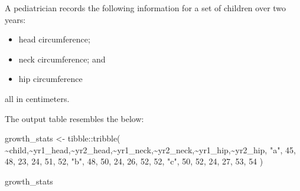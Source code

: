 \documentclass[
  letterpaper,
  DIV=11,
  numbers=noendperiod]{scrreprt}
\newenvironment{Shaded}{\begin{snugshade}}{\end{snugshade}}
\newcommand{\DecValTok}[1]{\textcolor[rgb]{0.68,0.00,0.00}{#1}}
\newcommand{\FunctionTok}[1]{\textcolor[rgb]{0.28,0.35,0.67}{#1}}
\newcommand{\NormalTok}[1]{\textcolor[rgb]{0.00,0.23,0.31}{#1}}
\newcommand{\OtherTok}[1]{\textcolor[rgb]{0.00,0.23,0.31}{#1}}
\newcommand{\SpecialCharTok}[1]{\textcolor[rgb]{0.37,0.37,0.37}{#1}}
\newcommand{\StringTok}[1]{\textcolor[rgb]{0.13,0.47,0.30}{#1}}
\providecommand{\tightlist}{%
  \setlength{\itemsep}{0pt}\setlength{\parskip}{0pt}}\usepackage{longtable,booktabs,array}
\begin{document}
\begin{tcolorbox}[enhanced jigsaw, title=\textcolor{quarto-callout-tip-color}{\faLightbulb}\hspace{0.5em}{Practice}, colbacktitle=quarto-callout-tip-color!10!white, leftrule=.75mm, arc=.35mm, opacityback=0, bottomrule=.15mm, rightrule=.15mm, toptitle=1mm, breakable, toprule=.15mm, colback=white, coltitle=black, colframe=quarto-callout-tip-color-frame, bottomtitle=1mm, titlerule=0mm, left=2mm, opacitybacktitle=0.6]

A pediatrician records the following information for a set of children
over two years:

\begin{itemize}
\tightlist
\item
  head circumference;
\item
  neck circumference; and
\item
  hip circumference
\end{itemize}

all in centimeters.

The output table resembles the below:

\begin{Shaded}
\begin{Highlighting}[]
\NormalTok{growth\_stats }\OtherTok{\textless{}{-}} 
\NormalTok{  tibble}\SpecialCharTok{::}\FunctionTok{tribble}\NormalTok{(}
    \SpecialCharTok{\textasciitilde{}}\NormalTok{child,}\SpecialCharTok{\textasciitilde{}}\NormalTok{yr1\_head,}\SpecialCharTok{\textasciitilde{}}\NormalTok{yr2\_head,}\SpecialCharTok{\textasciitilde{}}\NormalTok{yr1\_neck,}\SpecialCharTok{\textasciitilde{}}\NormalTok{yr2\_neck,}\SpecialCharTok{\textasciitilde{}}\NormalTok{yr1\_hip,}\SpecialCharTok{\textasciitilde{}}\NormalTok{yr2\_hip,}
       \StringTok{"a"}\NormalTok{,       }\DecValTok{45}\NormalTok{,       }\DecValTok{48}\NormalTok{,       }\DecValTok{23}\NormalTok{,       }\DecValTok{24}\NormalTok{,      }\DecValTok{51}\NormalTok{,      }\DecValTok{52}\NormalTok{,}
       \StringTok{"b"}\NormalTok{,       }\DecValTok{48}\NormalTok{,       }\DecValTok{50}\NormalTok{,       }\DecValTok{24}\NormalTok{,       }\DecValTok{26}\NormalTok{,      }\DecValTok{52}\NormalTok{,      }\DecValTok{52}\NormalTok{,}
       \StringTok{"c"}\NormalTok{,       }\DecValTok{50}\NormalTok{,       }\DecValTok{52}\NormalTok{,       }\DecValTok{24}\NormalTok{,       }\DecValTok{27}\NormalTok{,      }\DecValTok{53}\NormalTok{,      }\DecValTok{54}
\NormalTok{    )}

\NormalTok{growth\_stats}
\end{Highlighting}
\end{Shaded}


\end{tcolorbox}
\end{document}

